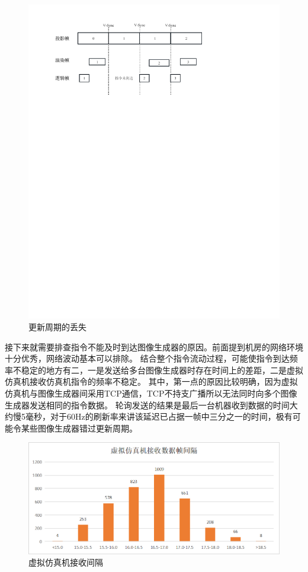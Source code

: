 \begin{figure}[h!]
    \begin{center}
        \includegraphics[width=\textwidth]{pictures/tearreason.pdf}
        \caption{更新周期的丢失}
        \label{tearreason}
    \end{center}
\end{figure}
\par 
接下来就需要排查指令不能及时到达图像生成器的原因。前面提到机房的网络环境十分优秀，网络波动基本可以排除。
结合整个指令流动过程，可能使指令到达频率不稳定的地方有二，一是发送给多台图像生成器时存在时间上的差距，二是虚拟仿真机接收仿真机指令的频率不稳定。
其中，第一点的原因比较明确，因为虚拟仿真机与图像生成器间采用TCP通信，TCP不持支广播所以无法同时向多个图像生成器发送相同的指令数据。
轮询发送的结果是最后一台机器收到数据的时间大约慢5毫秒，对于60Hz的刷新率来讲该延迟已占据一帧中三分之一的时间，极有可能令某些图像生成器错过更新周期。
\begin{figure}[h!]
    \begin{center}
        \includegraphics[width=\textwidth]{pictures/interval.png}
        \caption{虚拟仿真机接收间隔}
        \label{interval}
    \end{center}
\end{figure}
